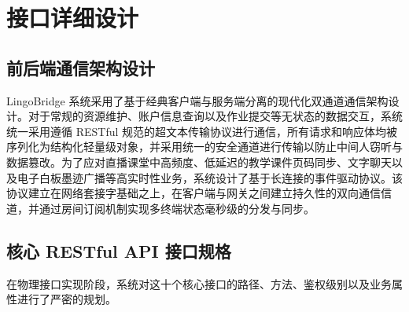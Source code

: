 \chapter{接口详细设计}

\section{前后端通信架构设计}
LingoBridge 系统采用了基于经典客户端与服务端分离的现代化双通道通信架构设计。对于常规的资源维护、账户信息查询以及作业提交等无状态的数据交互，系统统一采用遵循 RESTful 规范的超文本传输协议进行通信，所有请求和响应体均被序列化为结构化轻量级对象，并采用统一的安全通道进行传输以防止中间人窃听与数据篡改。为了应对直播课堂中高频度、低延迟的教学课件页码同步、文字聊天以及电子白板墨迹广播等高实时性业务，系统设计了基于长连接的事件驱动协议。该协议建立在网络套接字基础之上，在客户端与网关之间建立持久性的双向通信信道，并通过房间订阅机制实现多终端状态毫秒级的分发与同步。

\section{核心 RESTful API 接口规格}
在物理接口实现阶段，系统对这十个核心接口的路径、方法、鉴权级别以及业务属性进行了严密的规划。

